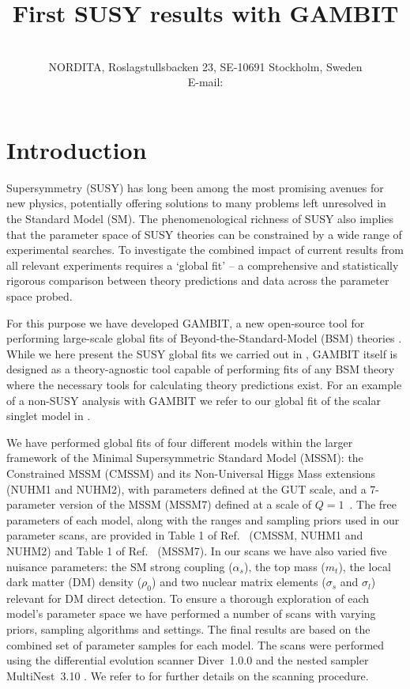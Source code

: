 \documentclass{PoS}
\title{First SUSY results with GAMBIT}
\author{\speaker{Anders Kvellestad} \normalfont{on behalf of the GAMBIT collaboration}\\%
       NORDITA, Roslagstullsbacken 23, SE-10691 Stockholm, Sweden\\
       E-mail: \email{anders.kvellestad@nordita.org}}
\newcommand{\eV}{\ensuremath{\text{e}\mspace{-0.8mu}\text{V}}\xspace}
\newcommand{\TeV}{\text{T\eV}\xspace}
\newcommand{\gambit}{\textsf{GAMBIT}\xspace}
\newcommand{\GB}{\gambit}
\newcommand\MultiNest{\textsf{MultiNest}\xspace}
\newcommand\multinest{\MultiNest}
\newcommand\diver{\textsf{Diver}\xspace}
\begin{document}
\section{Introduction}

Supersymmetry (SUSY) has long been among the most promising avenues for new physics, potentially offering solutions to many problems left unresolved in the Standard Model (SM).  The phenomenological richness of SUSY also implies that the parameter space of SUSY theories can be constrained by a wide range of experimental searches.  To investigate the combined impact of current results from all relevant experiments requires a `global fit' -- a comprehensive and statistically rigorous comparison between theory predictions and data across the parameter space probed.


For this purpose we have developed \GB, a new open-source tool for performing large-scale global fits of Beyond-the-Standard-Model (BSM) theories \cite{gambit,SDPBit,DarkBit,ColliderBit,FlavBit,ScannerBit}.  While we here present the SUSY global fits we carried out in \cite{CMSSM,MSSM}, \GB itself is designed as a theory-agnostic tool capable of performing fits of any BSM theory where the necessary tools for calculating theory predictions exist.  For an example of a non-SUSY analysis with GAMBIT we refer to our global fit of the scalar singlet model in \cite{SSDM}.


We have performed global fits of four different models within the larger framework of the Minimal Supersymmetric Standard Model (MSSM): the Constrained MSSM (CMSSM) and its Non-Universal Higgs Mass extensions (NUHM1 and NUHM2), with parameters defined at the GUT scale, and a 7-parameter version of the MSSM (MSSM7) defined at a scale of $Q=1$~\TeV.  
The free parameters of each model, along with the ranges and sampling priors used in our parameter scans, are provided in Table 1 of Ref.\ \cite{CMSSM} (CMSSM, NUHM1 and NUHM2) and Table 1 of Ref.\ \cite{MSSM} (MSSM7). 
In our scans we have also varied five nuisance parameters: the SM strong coupling ($\alpha_s$), the top mass ($m_t$), the local dark matter (DM) density ($\rho_0$) and two nuclear matrix elements ($\sigma_s$ and $\sigma_l$) relevant for DM direct detection.  To ensure a thorough exploration of each model's parameter space we have performed a number of scans with varying priors, sampling algorithms and settings. The final results are based on the combined set of parameter samples for each model.  The scans were performed using the differential evolution scanner \diver~\textsf{1.0.0} \cite{ScannerBit}
and the nested sampler \multinest~\textsf{3.10} \cite{MultiNest}.  We refer to \cite{CMSSM,MSSM} for further details on the scanning procedure.
\end{document}
